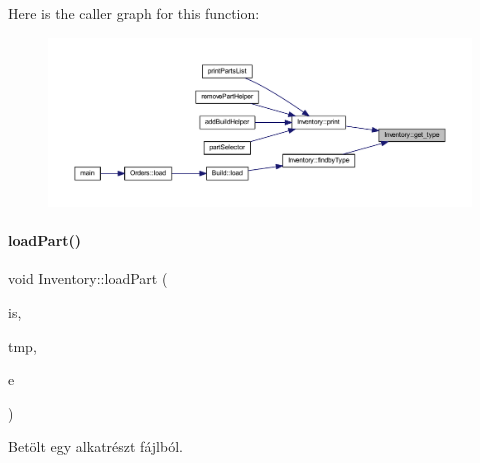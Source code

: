 Here is the caller graph for this function\+:
\nopagebreak
\begin{figure}[H]
\begin{center}
\leavevmode
\includegraphics[width=350pt]{class_inventory_a217895dbb60e3d7643c41fdeeb775bc9_icgraph}
\end{center}
\end{figure}
\mbox{\label{class_inventory_a78912f140decdd10037eb682cf295d72}} 
\paragraph{\texorpdfstring{loadPart()}{loadPart()}\hspace{0.1cm}{\footnotesize\ttfamily [1/2]}}
{\footnotesize\ttfamily void Inventory\+::load\+Part (\begin{DoxyParamCaption}\item[{std\+::fstream \&}]{is,  }\item[{\mbox{\hyperlink{struct_temp_input}{Temp\+Input}} \&}]{tmp,  }\item[{\mbox{\hyperlink{_parts_8h_abddff37837f171d72a2e16a1448a3943}{enum\+Part}}}]{e }\end{DoxyParamCaption})}



Betölt egy alkatrészt fájlból. 

